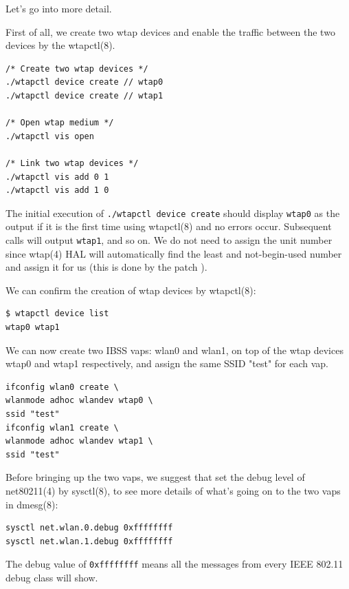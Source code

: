 \documentclass[conference]{IEEEtran}
\begin{document}
Let’s go into more detail.

First of all, we create two wtap devices and enable the traffic between the two devices by the wtapctl(8).

\begin{lstlisting}[caption=Create wtap devices, label={lst:wtap_tool}]
/* Create two wtap devices */
./wtapctl device create // wtap0
./wtapctl device create // wtap1

/* Open wtap medium */
./wtapctl vis open

/* Link two wtap devices */
./wtapctl vis add 0 1
./wtapctl vis add 1 0
\end{lstlisting}

The initial execution of \lstinline{./wtapctl device create} should display \lstinline{wtap0} as the output if it is the first time using wtapctl(8) and no errors occur. Subsequent calls will output \lstinline{wtap1}, and so on. We do not need to assign the unit number since wtap(4) HAL will automatically find the least and not-begin-used number and assign it for us (this is done by the patch \cite{commit:wtapctl}).

We can confirm the creation of wtap devices by wtapctl(8):

\begin{lstlisting}[caption=Show wtap devices, label={lst:sysctl}]
$ wtapctl device list
wtap0 wtap1
\end{lstlisting}

We can now create two IBSS vaps: wlan0 and wlan1, on top of the wtap devices wtap0 and wtap1 respectively, and assign the same SSID "test" for each vap.

\begin{lstlisting}
ifconfig wlan0 create \
wlanmode adhoc wlandev wtap0 \
ssid "test"
ifconfig wlan1 create \
wlanmode adhoc wlandev wtap1 \
ssid "test"
\end{lstlisting}

Before bringing up the two vaps, we suggest that set the debug level of net80211(4) by sysctl(8), to see more details of what's going on to the two vaps in dmesg(8):

\begin{lstlisting}[caption=Debug level, label={lst:debug}]
sysctl net.wlan.0.debug 0xffffffff
sysctl net.wlan.1.debug 0xffffffff
\end{lstlisting}

The debug value of \lstinline{0xffffffff} means all the messages from every IEEE 802.11 debug class will show.
\end{document}

